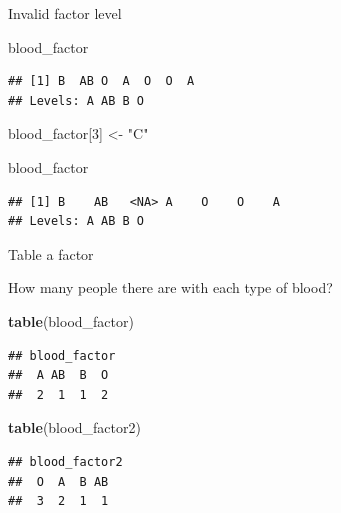 \documentclass[ignorenonframetext,]{beamer}
\newenvironment{Shaded}{\begin{snugshade}}{\end{snugshade}}
\newcommand{\DecValTok}[1]{\textcolor[rgb]{0.00,0.00,0.81}{#1}}
\newcommand{\KeywordTok}[1]{\textcolor[rgb]{0.13,0.29,0.53}{\textbf{#1}}}
\newcommand{\NormalTok}[1]{#1}
\newcommand{\StringTok}[1]{\textcolor[rgb]{0.31,0.60,0.02}{#1}}
\begin{document}
\begin{frame}[fragile]{Invalid factor level}
\protect\hypertarget{invalid-factor-level}{}

\begin{Shaded}
\begin{Highlighting}[]
\NormalTok{blood_factor}
\end{Highlighting}
\end{Shaded}

\begin{verbatim}
## [1] B  AB O  A  O  O  A 
## Levels: A AB B O
\end{verbatim}

\begin{Shaded}
\begin{Highlighting}[]
\NormalTok{blood_factor[}\DecValTok{3}\NormalTok{] <-}\StringTok{ "C"}
\end{Highlighting}
\end{Shaded}

\begin{Shaded}
\begin{Highlighting}[]
\NormalTok{blood_factor}
\end{Highlighting}
\end{Shaded}

\begin{verbatim}
## [1] B    AB   <NA> A    O    O    A   
## Levels: A AB B O
\end{verbatim}

\end{frame}

\begin{frame}[fragile]{Table a factor}
\protect\hypertarget{table-a-factor}{}

How many people there are with each type of blood?

\begin{Shaded}
\begin{Highlighting}[]
\KeywordTok{table}\NormalTok{(blood_factor)}
\end{Highlighting}
\end{Shaded}

\begin{verbatim}
## blood_factor
##  A AB  B  O 
##  2  1  1  2
\end{verbatim}

\begin{Shaded}
\begin{Highlighting}[]
\KeywordTok{table}\NormalTok{(blood_factor2)}
\end{Highlighting}
\end{Shaded}

\begin{verbatim}
## blood_factor2
##  O  A  B AB 
##  3  2  1  1
\end{verbatim}

\end{frame}
\end{document}
